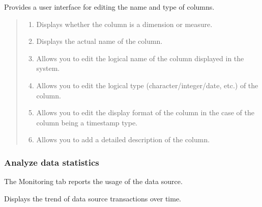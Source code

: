 \documentclass[letterpaper,10pt,english]{sphinxmanual}
\begin{document}
Provides a user interface for editing the name and type of columns.
\begin{quote}

\begin{figure}[H]
\centering

\noindent{}
\end{figure}
\begin{enumerate}
\def\theenumi{\arabic{enumi}}
\def\labelenumi{\theenumi .}
\makeatletter\def\p@enumii{\p@enumi \theenumi .}\makeatother
\item {} 
 Displays whether the column is a dimension or measure.

\item {} 
 Displays the actual name of the column.

\item {} 
 Allows you to edit the logical name of the column displayed in the system.

\item {} 
 Allows you to edit the logical type (character/integer/date, etc.) of the column.

\item {} 
 Allows you to edit the display format of the column in the case of the column being a timestamp type.

\item {} 
 Allows you to add a detailed description of the column.

\end{enumerate}
\end{quote}


\subsubsection{Analyze data statistics}
\label{\detokenize{discovery/part02/data_source_detail_view:id5}}
The Monitoring tab reports the usage of the data source.


Displays the trend of data source transactions over time.
\begin{quote}

\begin{figure}[H]
\centering

\noindent{}
\end{figure}
\end{quote}
\end{document}
